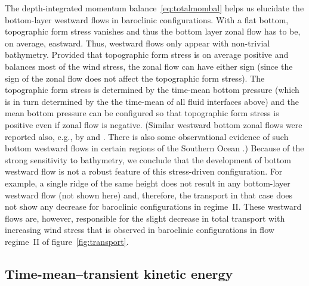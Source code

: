 \documentclass{agujournal2019}
\begin{document}
The depth-integrated momentum balance~\eqref{eq:totalmombal} helps us elucidate the bottom-layer westward flows in baroclinic configurations. With a flat bottom, topographic form stress vanishes and thus the bottom layer zonal flow has to be, on average, eastward. Thus, westward flows only appear with non-trivial bathymetry. Provided that topographic form stress is on average positive and balances most of the wind stress, the zonal flow can have either sign (since the sign of the zonal flow does {\color{black} not} affect the topographic form stress). The topographic form stress is determined by the time-mean bottom pressure (which is in turn determined by the the time-mean of all fluid interfaces above) and the mean bottom pressure can be configured so that topographic form stress is positive even if zonal flow is negative. (Similar westward bottom zonal flows were reported also, e.g., by  and . There is also some observational evidence of such bottom westward flows in certain regions of the Southern Ocean \cite{Cunningham-Barker-1996}.) Because of the strong sensitivity to bathymetry, we conclude that the development of bottom westward flow is not a robust feature of this stress-driven configuration. For example, a single ridge of the same height does not result in any bottom-layer westward flow (not shown here) {\color{black}and, therefore, the transport in that case does not show any decrease for baroclinic configurations in regime~II.} These westward flows are, however,  responsible for the slight decrease in total transport with increasing wind stress that is observed in baroclinic configurations in flow regime~II of figure~\ref{fig:transport}.




\subsection{Time-mean--transient kinetic energy}\label{sec:resultdetails2}
\end{document}
